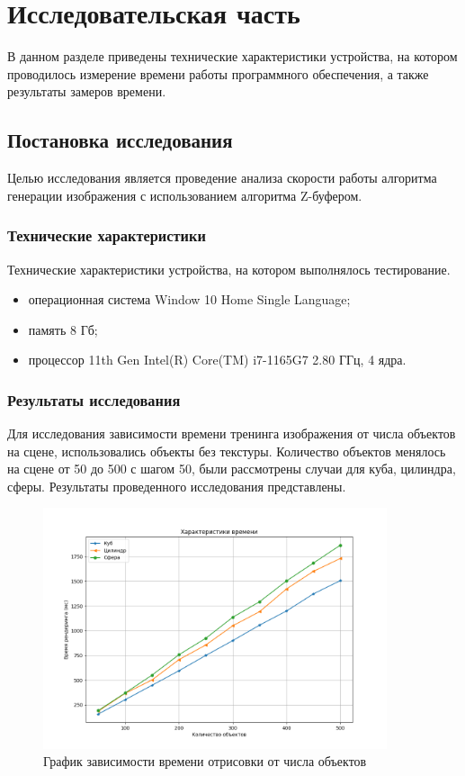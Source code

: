 \section{Исследовательская часть}
В данном разделе приведены технические характеристики устройства, на котором проводилось измерение времени работы программного обеспечения, а также результаты замеров времени.

\subsection{Постановка исследования}

Целью исследования является проведение анализа скорости работы алгоритма генерации изображения с использованием алгоритма Z-буфером.

\subsubsection{Технические характеристики}

Технические характеристики устройства, на котором выполнялось тестирование.
\begin{itemize}
	\item операционная система Window 10 Home Single Language;
	\item память 8 Гб;
	\item процессор 11th Gen Intel(R) Core(TM) i7-1165G7 2.80 ГГц, 4 ядра.
\end{itemize}

\subsubsection{Результаты исследования}

Для исследования зависимости времени тренинга изображения от числа объектов на сцене, использовались объекты без текстуры. Количество объектов менялось на сцене от 50 до 500 с шагом 50, были рассмотрены случаи для куба, цилиндра, сферы. Результаты проведенного исследования представлены.

\begin{figure}[h]
	\centering
	\includegraphics[width=0.9\textwidth]{img/exp/exp1.png}
	\caption{График зависимости времени отрисовки от числа объектов}
	\label{fig:exp-1}
\end{figure}

